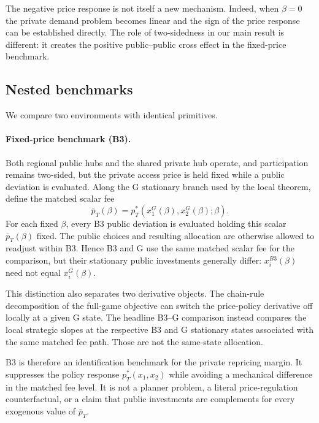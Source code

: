 The negative price response is not itself a new mechanism. Indeed, when $\beta=0$ the private demand problem becomes linear and the sign of the price response can be established directly. The role of two-sidedness in our main result is different: it creates the positive public--public cross effect in the fixed-price benchmark.

\subsection{Nested benchmarks}

We compare two environments with identical primitives.

\paragraph{Fixed-price benchmark (B3).}
Both regional public hubs and the shared private hub operate, and participation remains two-sided, but the private access price is held fixed while a public deviation is evaluated. Along the G stationary branch used by the local theorem, define the matched scalar fee
\begin{equation}
\bar p_T(\beta)
= p_T^*\!\left(x_1^G(\beta),x_2^G(\beta);\beta\right).
\label{eq:matchedpricepath}
\end{equation}
For each fixed $\beta$, every B3 public deviation is evaluated holding this scalar $\bar p_T(\beta)$ fixed. The public choices and resulting allocation are otherwise allowed to readjust within B3. Hence B3 and G use the same matched scalar fee for the comparison, but their stationary public investments generally differ: $x_i^{B3}(\beta)$ need not equal $x_i^G(\beta)$.

This distinction also separates two derivative objects. The chain-rule decomposition of the full-game objective can switch the price-policy derivative off locally at a given G state. The headline B3--G comparison instead compares the local strategic slopes at the respective B3 and G stationary states associated with the same matched fee path. Those are not the same-state allocation.

B3 is therefore an identification benchmark for the private repricing margin. It suppresses the policy response $p_T^*(x_1,x_2)$ while avoiding a mechanical difference in the matched fee level. It is not a planner problem, a literal price-regulation counterfactual, or a claim that public investments are complements for every exogenous value of $\bar p_T$.

